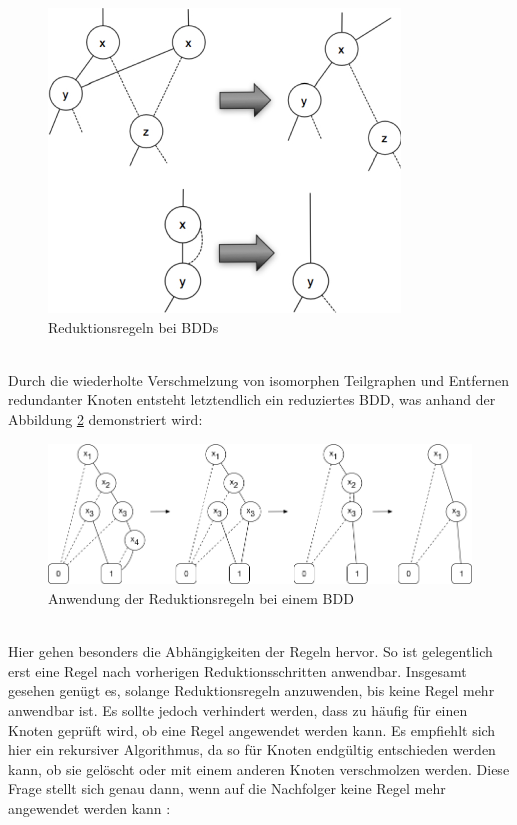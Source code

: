 \begin{figure}[bth]
	\centering
	\includegraphics[scale=1.0]{./img/reduziert}
	\caption[Reduktionsregeln bei BDDs]{Reduktionsregeln bei BDDs}
	\label{fig:reduziert}
\end{figure}\\
\noindent
Durch die wiederholte Verschmelzung von isomorphen Teilgraphen und Entfernen redundanter Knoten entsteht letztendlich ein reduziertes BDD, was anhand der Abbildung \ref{fig:reduktionen} demonstriert wird:
\begin{figure}[bth]
	\centering
	\includegraphics[scale=0.4]{./img/reduktionen}
	\caption[Anwendung der Reduktionsregeln bei einem BDD]{Anwendung der Reduktionsregeln bei einem BDD}
	\label{fig:reduktionen}
\end{figure}\\
\noindent
Hier gehen besonders die Abhängigkeiten der Regeln hervor. So ist gelegentlich erst eine Regel nach vorherigen Reduktionsschritten anwendbar. Insgesamt gesehen genügt es, solange Reduktionsregeln anzuwenden, bis keine Regel mehr anwendbar ist. Es sollte jedoch verhindert werden, dass zu häufig für einen Knoten geprüft wird, ob eine Regel angewendet werden kann. Es empfiehlt sich hier ein rekursiver Algorithmus, da so für Knoten endgültig entschieden werden kann, ob sie gelöscht oder mit einem anderen Knoten verschmolzen werden. Diese Frage stellt sich genau dann, wenn auf die Nachfolger keine Regel mehr angewendet werden kann \cite{a2010}:
